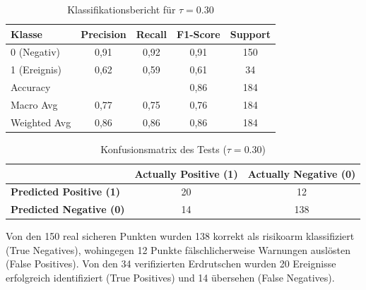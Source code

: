 \documentclass[../main.tex]{subfiles}
\begin{document}
\begin{table}[h]
    \centering
    \caption{Klassifikationsbericht für $\tau = 0.30$}
    \vspace{0.5cm}
    \begin{tabular}{lcccc}
        \toprule
        \textbf{Klasse} & \textbf{Precision} & \textbf{Recall} & \textbf{F1-Score} & \textbf{Support} \\
        \midrule
        0 (Negativ)     & 0,91               & 0,92            & 0,91              & 150              \\
        1 (Ereignis)    & 0,62               & 0,59            & 0,61              & 34               \\
        \midrule
        Accuracy        &                    &                 & 0,86              & 184              \\
        Macro Avg       & 0,77               & 0,75            & 0,76              & 184              \\
        Weighted Avg    & 0,86               & 0,86            & 0,86              & 184              \\
        \bottomrule
    \end{tabular}
\end{table}





\begin{table}[ht]
    \centering
    \caption{Konfusionsmatrix des Tests ($\tau=0.30$)}
    \vspace{0.5cm}
    \label{tab:confusion_matrix_custom_clean}
    \renewcommand{\arraystretch}{1.5}
    \begin{tabular}{|l|c|c|}
        \hline
                                        & \textbf{Actually Positive (1)} & \textbf{Actually Negative (0)} \\
        \hline
        \textbf{Predicted Positive (1)} & 20                             & 12                             \\
        \hline
        \textbf{Predicted Negative (0)} & 14                             & 138                            \\
        \hline
    \end{tabular}
\end{table}
Von den 150 real sicheren Punkten wurden 138 korrekt als risikoarm klassifiziert (True Negatives), wohingegen 12 Punkte fälschlicherweise Warnungen auslösten (False Positives). Von den 34 verifizierten Erdrutschen wurden 20 Ereignisse erfolgreich identifiziert (True Positives) und 14 übersehen (False Negatives).
\end{document}

